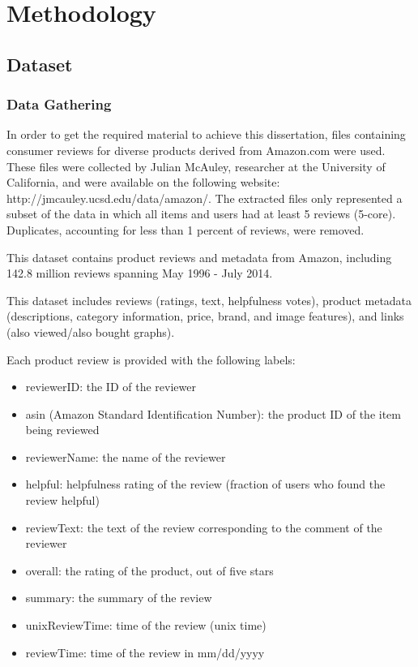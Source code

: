 \chapter{Methodology}

\section{Dataset}

\subsection{Data Gathering}
In order to get the required material to achieve this dissertation, files containing consumer reviews for diverse products derived from Amazon.com were used. These files were collected by Julian McAuley, researcher at the University of California, and were available on the following website: http://jmcauley.ucsd.edu/data/amazon/. The extracted files only represented a subset of the data in which all items and users had at least 5 reviews (5-core). Duplicates, accounting for less than 1 percent of reviews, were removed.

This dataset contains product reviews and metadata from Amazon, including 142.8 million reviews spanning May 1996 - July 2014.

This dataset includes reviews (ratings, text, helpfulness votes), product metadata (descriptions, category information, price, brand, and image features), and links (also viewed/also bought graphs). 

Each product review is provided with the following labels:
\begin{itemize}
\item reviewerID: the ID of the reviewer
\item asin (Amazon Standard Identification Number): the product ID of the item being reviewed
\item reviewerName: the name of the reviewer
\item helpful: helpfulness rating of the review (fraction of users who found the review helpful)
\item reviewText: the text of the review corresponding to the comment of the reviewer
\item overall: the rating of the product, out of five stars
\item summary: the summary of the review
\item unixReviewTime: time of the review (unix time)
\item reviewTime: time of the review in mm/dd/yyyy
\end{itemize}

